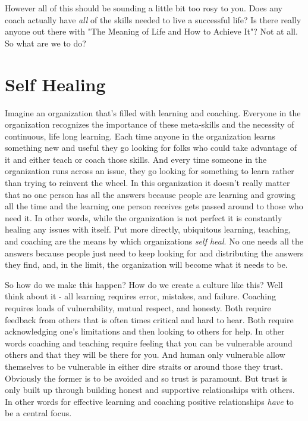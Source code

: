 \documentclass[11pt]{book}
\begin{document}
However all of this should be sounding a little bit too rosy to you. Does any coach actually have \textit{all} of the skills needed to live a successful life? Is there really anyone out there with "The Meaning of Life and How to Achieve It"? Not at all. So what are we to do? 

\section{Self Healing}
Imagine an organization that's filled with learning and coaching. Everyone in the organization recognizes the importance of these meta-skills and the necessity of continuous, life long learning. Each time anyone in the organization learns something new and useful they go looking for folks who could take advantage of it and either teach or coach those skills. And every time someone in the organization runs across an issue, they go looking for something to learn rather than trying to reinvent the wheel. In this organization it doesn't really matter that no one person has all the answers because people are learning and growing all the time and the learning one person receives gets passed around to those who need it. In other words, while the organization is not perfect it is constantly healing any issues with itself. Put more directly, ubiquitous learning, teaching, and coaching are the means by which organizations \textit{self heal}. No one needs all the answers because people just need to keep looking for and distributing the answers they find, and, in the limit, the organization will become what it needs to be.
\newline

So how do we make this happen? How do we create a culture like this? Well think about it - all learning requires error, mistakes, and failure. Coaching requires loads of vulnerability, mutual respect, and honesty. Both require feedback from others that is often times critical and hard to hear. Both require acknowledging one's limitations and then looking to others for help. In other words coaching and teaching require feeling that you can be vulnerable around others and that they will be there for you. And human only vulnerable allow themselves to be vulnerable in either dire straits or around those they trust. Obviously the former is to be avoided and so trust is paramount. But trust is only built up through building honest and supportive relationships with others. In other words for effective learning and coaching positive relationships \textit{have} to be a central focus.
\newline
\end{document}
